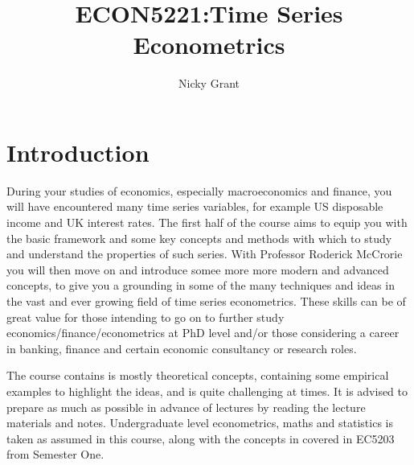 \documentclass[openany]{tufte-book} %
\begin{document}
\title{ECON5221:Time Series Econometrics}
\author[Nicky  Grant]{Nicky Grant}

\restoregeometry %
\nopagecolor%





\chapter*{Introduction} %

During your studies of economics, especially macroeconomics and finance, you will have encountered many time series variables, for example  US disposable income and UK interest rates. The first half of the course aims to equip you with the basic framework and some key concepts and methods with which to study and understand the  properties of such series. With Professor Roderick McCrorie you will then move on and introduce somee more more modern and advanced concepts, to give you a grounding in some of the many techniques and ideas in the vast and ever growing field of time series econometrics. These skills can be of great value for those intending to go on to further study economics/finance/econometrics at PhD level and/or those considering a career in banking, finance and certain economic consultancy or research roles.


 The course contains is mostly theoretical concepts, containing some empirical examples to highlight the ideas, and is quite challenging at times. It is advised to prepare as much as possible in advance of lectures by reading the lecture materials and notes. Undergraduate level econometrics, maths and statistics is taken as assumed in this course, along with the concepts in covered in EC5203 from Semester One.
\end{document}
